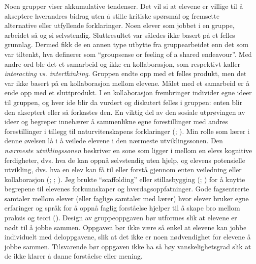 \documentclass[12pt,twoside,onecolumn,norsk]{article}
\begin{document}
\newline
Noen grupper viser akkumulative tendenser. Det vil si at elevene 
er villige til å akseptere hverandres bidrag uten å stille kritiske spørsmål og fremsette
alternative eller utfyllende forklaringer. Noen elever som jobbet i en gruppe, arbeidet så og si
selvstendig. Sluttresultet var
således ikke basert på et felles grunnlag. Dermed fikk de en annen type utbytte fra gruppearbeidet
enn det som var tiltenkt, hva   definerer som ``groupsense or feeling of a 
shared endeavour''. Med andre ord ble det et samarbeid og ikke en kollaborasjon, som  
respektivt kaller \emph{interacting vs. interthinking}. Gruppen endte opp med et felles produkt, 
men det var ikke basert på en kollaborasjon mellom elevene. Målet med et samarbeid er å ende opp 
med et sluttprodukt. I en kollaborasjon frembringer individer egne ideer til gruppen, og hver ide
blir da vurdert og diskutert felles i gruppen: enten blir den akseptert eller så forkastes den.
En viktig del av den sosiale utprøvingen av ideer og begreper innebærer å sammenlikne egne 
forestillinger med andres forestillinger i tillegg til naturvitenskapens forklaringer 
(; ).
\newline
\newline
Min rolle som lærer i denne øvelsen lå i å veilede elevene i den nærmeste utviklingssonen.
Den \emph{nærmeste utviklingssonen} beskriver en sone som ligger i mellom en elevs kognitive 
ferdigheter, dvs. hva de kan oppnå selvstendig uten hjelp, og elevens potensielle utvikling, dvs. 
hva en elev kan få til eller forstå gjennom enten veiledning eller kollaborasjon 
(; ; ). Jeg brukte ``scaffolding'' 
eller stillasbygging (; ) for å knytte begrepene til elevenes 
forkunnskaper og hverdagsoppfatninger.  Gode fagsentrerte samtaler mellom elever (eller faglige 
samtaler med lærer) hvor elever bruker egne erfaringer og språk for å oppnå faglig forståelse 
hjelper til å skape bro mellom praksis og teori ().
\newline
\newline
Design av gruppeoppgaven bør utformes slik at elevene er 
nødt til å jobbe sammen. Oppgaven bør ikke være så enkel at elevene kan jobbe individuelt med 
deloppgavene, slik at det ikke er noen nødvendighet for elevene å jobbe sammen. Tilsvarende 
bør oppgaven ikke ha så høy vanskelighetsgrad slik at de ikke klarer å danne forståelse eller mening. 
\end{document}
